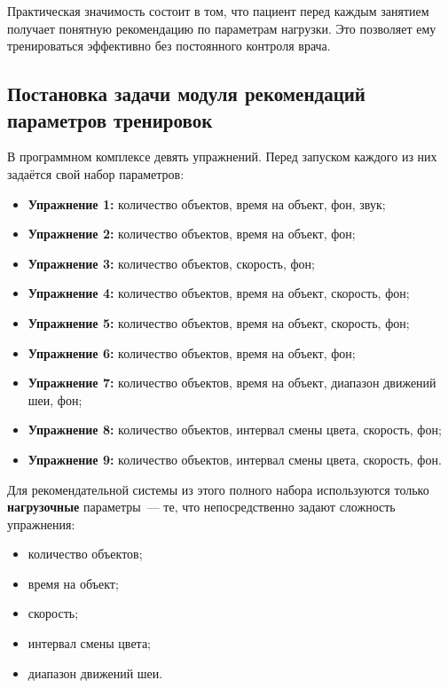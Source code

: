 Практическая значимость состоит в том, что пациент перед каждым занятием получает понятную рекомендацию по параметрам нагрузки. Это позволяет ему тренироваться эффективно без постоянного контроля врача. 

\subsection{Постановка задачи модуля рекомендаций параметров тренировок}

В программном комплексе девять упражнений. Перед запуском каждого
из них задаётся свой набор параметров:

\begin{itemize}
    \item \textbf{Упражнение 1:} количество объектов, время на объект,
    фон, звук;
    \item \textbf{Упражнение 2:} количество объектов, время на объект,
    фон;
    \item \textbf{Упражнение 3:} количество объектов, скорость, фон;
    \item \textbf{Упражнение 4:} количество объектов, время на объект,
    скорость, фон;
    \item \textbf{Упражнение 5:} количество объектов, время на объект,
    скорость, фон;
    \item \textbf{Упражнение 6:} количество объектов, время на объект,
    фон;
    \item \textbf{Упражнение 7:} количество объектов, время на объект,
    диапазон движений шеи, фон;
    \item \textbf{Упражнение 8:} количество объектов, интервал смены
    цвета, скорость, фон;
    \item \textbf{Упражнение 9:} количество объектов, интервал смены
    цвета, скорость, фон.
\end{itemize}

Для рекомендательной системы из этого полного набора используются
только \textbf{нагрузочные} параметры~--- те, что непосредственно
задают сложность упражнения:

\begin{itemize}
    \item количество объектов;
    \item время на объект;
    \item скорость;
    \item интервал смены цвета;
    \item диапазон движений шеи.
\end{itemize}

